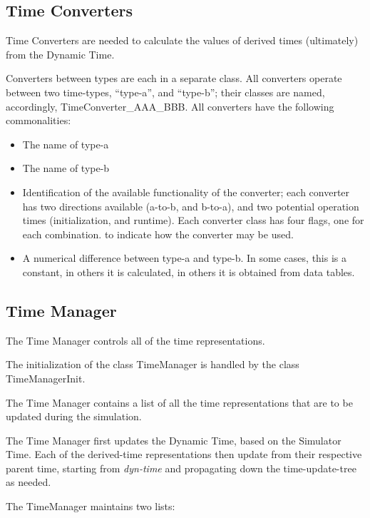 \subsection{Time Converters}
Time Converters are needed to calculate the values of derived times
(ultimately) from the Dynamic Time.

Converters between types are each in a separate class.  All converters
operate between two time-types,
{\textquotedblleft}type-a{\textquotedblright}, and
{\textquotedblleft}type-b{\textquotedblright}; their classes are named,
accordingly, TimeConverter\_AAA\_BBB.  All converters have the
following commonalities:


\begin{itemize}
\item The name of type-a
\item The name of type-b
\item Identification of the available functionality of the converter;
each converter has two directions available (a-to-b, and b-to-a), and
two potential operation times (initialization, and runtime).  Each
converter class has four flags, one for each combination. to indicate how
the converter may be used.
\item A numerical difference between type-a and type-b.  In some cases,
this is a constant, in others it is calculated, in others it is
obtained from data tables.
\end{itemize}



\subsection{Time Manager}
The Time Manager controls all of the time representations.

The initialization of the class TimeManager is handled by the class
TimeManagerInit.

The Time Manager contains a list of all the time representations that are to
be updated during the simulation.

The Time Manager first updates the Dynamic Time, based on the Simulator Time.  
Each of
the derived-time representations then update from their respective
parent time, starting from \textit{dyn-time} and propagating down the
time-update-tree as needed.




The TimeManager maintains two lists:


